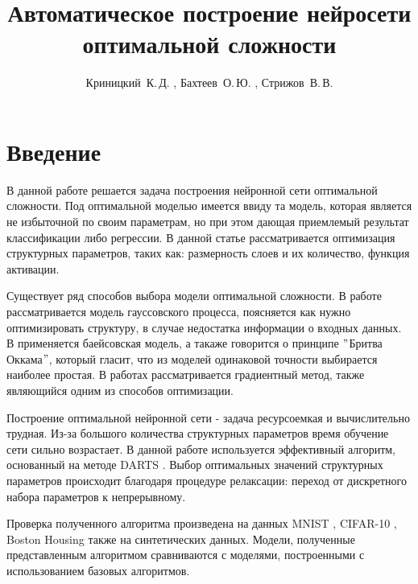 \documentclass[12pt, twoside]{article}
\title
    {Автоматическое построение нейросети оптимальной сложности }
\author
    {Криницкий~К.\,Д. , Бахтеев~О.\,Ю. , Стрижов~В.\,В.}
\begin{document}
\maketitle

\section{Введение}
  В данной работе решается задача построения нейронной сети оптимальной сложности. Под оптимальной моделью имеется ввиду та модель, которая является не избыточной по своим параметрам, но при этом дающая приемлемый результат классификации либо регрессии. В данной статье рассматривается оптимизация структурных параметров, таких как: размерность слоев и их количество, функция активации.
  \par Существует ряд способов выбора модели оптимальной сложности. В работе \cite{GaussianModel} рассматривается модель гауссовского процесса, поясняется как нужно оптимизировать структуру, в случае недостатка информации о входных данных. В \cite{BayesianModel} применяется баейсовская модель, а такаже говорится о принципе $"$Бритва Оккама$"$, который гласит, что из моделей одинаковой точности выбирается наиболее простая. В работах \cite{Gradient1,Gradient2,Gradient3,Gradient4} рассматривается градиентный метод, также являющийся одним из способов оптимизации. 
  \par Построение оптимальной нейронной сети - задача ресурсоемкая и вычислительно трудная. Из-за большого количества структурных параметров время обучение сети сильно возрастает. В данной работе используется эффективный алгоритм, основанный на методе DARTS \cite{DARTS}. Выбор оптимальных значений структурных параметров происходит благодаря процедуре релаксации: переход от дискретного набора параметров к непрерывному.
  \par Проверка полученного алгоритма произведена на данных MNIST \cite{MNIST}, CIFAR-10 \cite{CIFAR}, Boston Housing \cite{Boston} также на синтетических данных. Модели, полученные представленным алгоритмом сравниваются с моделями, построенными с использованием базовых алгоритмов.
\end{document}
